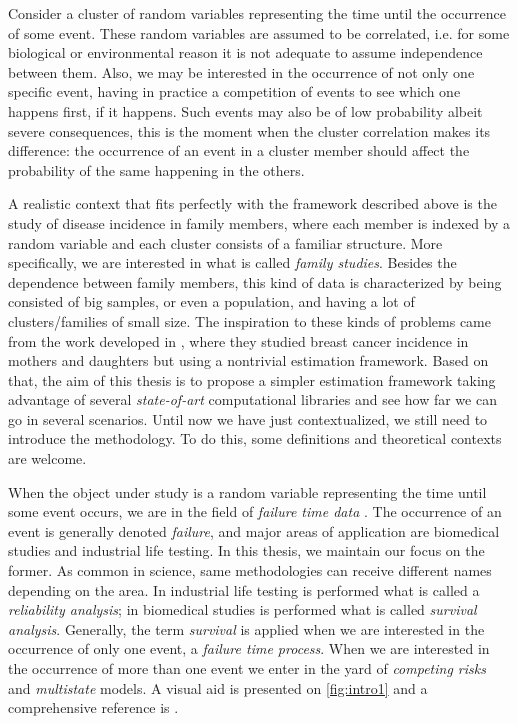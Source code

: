 Consider a cluster of random variables representing the time until the
occurrence of some event. These random variables are assumed to be
correlated, i.e. for some biological or environmental reason it is not
adequate to assume independence between them. Also, we may be interested
in the occurrence of not only one specific event, having in practice a
competition of events to see which one happens first, if it
happens. Such events may also be of low probability albeit severe
consequences, this is the moment when the cluster correlation makes its
difference: the occurrence of an event in a cluster member should affect
the probability of the same happening in the others.

A realistic context that fits perfectly with the framework described
above is the study of disease incidence in family members, where each
member is indexed by a random variable and each cluster consists of a
familiar structure. More specifically, we are interested in what is
called \textit{family studies}. Besides the dependence between family
members, this kind of data is characterized by being consisted of big
samples, or even a population, and having a lot of clusters/families of
small size. The inspiration to these kinds of problems came from the
work developed in , where they studied breast cancer
incidence in mothers and daughters but using a nontrivial estimation
framework. Based on that, the aim of this thesis is to propose a simpler
estimation framework taking advantage of several \textit{state-of-art}
computational libraries and see how far we can go in several
scenarios. Until now we have just contextualized, we still need to
introduce the methodology. To do this, some definitions and theoretical
contexts are welcome.

When the object under study is a random variable representing the time
until some event occurs, we are in the field of \textit{failure time
data} \cite{kalb&prentice}. The occurrence of an event is generally
denoted \textit{failure}, and major areas of application are biomedical
studies and industrial life testing. In this thesis, we maintain our
focus on the former. As common in science, same methodologies can
receive different names depending on the area. In industrial life
testing is performed what is called a \textit{reliability analysis}; in
biomedical studies is performed what is called
\textit{survival analysis}. Generally, the term \textit{survival} is
applied when we are interested in the occurrence of only one event, a
\textit{failure time process}. When we are interested in the occurrence
of more than one event we enter in the yard of \textit{competing risks}
and \textit{multistate} models. A visual aid is presented on
\autoref{fig:intro1} and a comprehensive reference is
.

